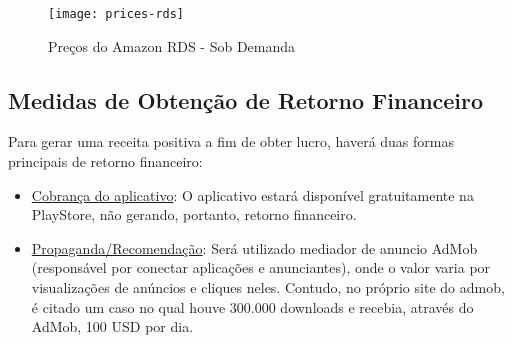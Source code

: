 \begin{figure}[h]
  \centering
  \texttt{[image: prices-rds]}
  \caption{Preços do Amazon RDS - Sob Demanda \\ \cite{AmazonRDS}}
  \label{fig:prices-rds}
\end{figure}	

\subsection{Medidas de Obtenção de Retorno Financeiro}

Para gerar uma receita positiva a fim de obter lucro, haverá duas formas principais de retorno financeiro:
\begin{itemize}
	\item \underline{Cobrança do aplicativo}: O aplicativo estará disponível gratuitamente na PlayStore, não gerando, portanto, retorno financeiro.
	\item \underline{Propaganda/Recomendação}: Será utilizado mediador de anuncio AdMob (responsável por conectar aplicações e anunciantes), onde o valor varia por visualizações de anúncios e cliques neles. Contudo, no próprio site do admob, é citado um caso no qual houve 300.000 downloads e recebia, através do AdMob, 100 USD por dia. \cite{GoogleAdMob}
\end{itemize}
